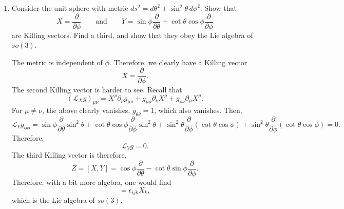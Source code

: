 \begin{enumerate}[label=\roman*)]
\begin{solution}
\begin{equation}
        \end{equation}
        Therefore, we can immediately write down the third Killing vector, and hence the isometry
        \begin{equation}
            \mathcal{L}_{[K,J]}g = \mathcal{L}_K(\mathcal{L}_Jg) -\mathcal{L}_J(\mathcal{L}_Kg) =0.
        \end{equation}
        Since $[K,J]$ is not a linear combination of $K$ and $J$, it generates an independent isometry.
    \end{solution}
    \item Consider the unit sphere with metric $ds^2 = d\theta^2 + \sin^2\theta\,d\phi^2$. Show that
    \begin{equation}
        X = \frac{\partial}{\partial\phi} \qquad \text{and} \qquad Y = \sin\phi\frac{\partial}{\partial\theta} + \cot\theta\cos\phi\frac{\partial}{\partial\phi}
    \end{equation}
    are Killing vectors. Find a third, and show that they obey the Lie algebra of $so(3)$.
    \begin{solution}
        The metric is independent of $\phi$. Therefore, we clearly have a Killing vector
        \begin{equation}
            X= \frac{\partial}{\partial\phi}.
        \end{equation}
        The second Killing vector is harder to see. Recall that
        \begin{equation}
            (\mathcal{L}_X g)_{\mu\nu} = X^\rho\partial_\rho g_{\mu\nu} + g_{\mu\rho}\partial_\nu X^\rho + g_{\rho\nu}\partial_\mu X^\rho.
        \end{equation}
        For $\mu\neq\nu$, the above clearly vanishes. $g_{\theta\theta} = 1$, which also vanishes. Then,
        \begin{equation}
            \mathcal{L}_Yg_{\phi\phi} = \sin\phi\frac{\partial}{\partial\theta}\sin^2\theta + \cot\theta\cos\phi\frac{\partial}{\partial\phi}\sin^2\theta + \sin^2\theta\frac{\partial}{\partial\phi}(\cot\theta\cos\phi) + \sin^2\theta\frac{\partial}{\partial\phi}(\cot\theta\cos\phi) = 0.
        \end{equation}
        Therefore,
        \begin{equation}
            \mathcal{L}_Yg = 0.
        \end{equation}
        The third Killing vector is therefore,
        \begin{equation}
            Z = [X,Y] = \cos\phi\frac{\partial}{\partial\theta} -\cot\theta\sin\phi\frac{\partial}{\partial\phi}.
        \end{equation}
        Therefore, with a bit more algebra, one would find
        \begin{equation}
            [X_i,X_j]= \epsilon_{ijk}X_k,
        \end{equation}
        which is the Lie algebra of $so(3)$.
    \end{solution}
\end{enumerate}

